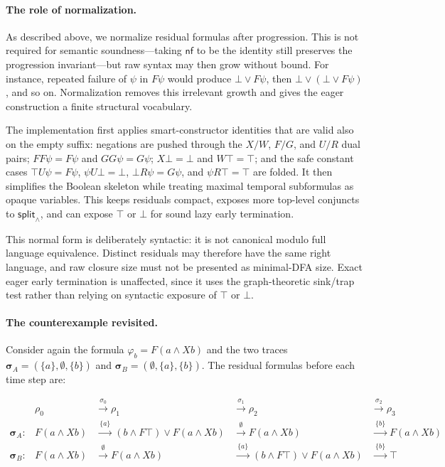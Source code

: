 \paragraph{The role of normalization.}
As described above, we normalize residual formulas after progression.  This is
not required for semantic soundness---taking $\mathsf{nf}$ to be the identity
still preserves the progression invariant---but raw syntax may then grow
without bound.  For instance, repeated failure of $\psi$ in
$F\psi$ would produce $\bot\lor F\psi$, then
$\bot\lor(\bot\lor F\psi)$, and so on.  Normalization removes this irrelevant
growth and gives the eager construction a finite structural vocabulary.

The implementation first applies smart-constructor identities that are valid
also on the empty suffix: negations are pushed through the $X/W$, $F/G$, and
$U/R$ dual pairs; $FF\psi=F\psi$ and $GG\psi=G\psi$;
$X\bot=\bot$ and $W\top=\top$; and the safe constant cases
$\top U\psi=F\psi$, $\psi U\bot=\bot$,
$\bot R\psi=G\psi$, and $\psi R\top=\top$ are folded.  It then simplifies the
Boolean skeleton while treating maximal temporal subformulas as opaque
variables.  This keeps residuals compact, exposes more top-level conjuncts to
$\mathsf{split}_\wedge$, and can expose $\top$ or $\bot$ for sound lazy early
termination.

This normal form is deliberately syntactic: it is not canonical modulo full
\ltlf language equivalence.  Distinct residuals may therefore have the same
right language, and raw closure size must not be presented as minimal-DFA
size.  Exact eager early termination is unaffected, since it uses the
graph-theoretic sink/trap test rather than relying on syntactic exposure of
$\top$ or $\bot$.

\paragraph{The counterexample revisited.}
Consider again the formula $\varphi_b = F(a\land Xb)$ and the two traces $\boldsymbol{\sigma}_A = (\{a\}, \emptyset, \{b\})$ and $\boldsymbol{\sigma}_B = (\emptyset, \{a\}, \{b\})$. The residual formulas before each time step are:

\[
\begin{array}{lllll}
 & \rho_0 & \xrightarrow{\ \sigma_0\ } \rho_1 & \xrightarrow{\ \sigma_1\ } \rho_2 & \xrightarrow{\ \sigma_2\ } \rho_3 \\[0.5ex]
\boldsymbol{\sigma}_A: & F(a \land Xb) & \xrightarrow{\ \{a\}\ } (b\land F\top) \lor F(a \land Xb) & \xrightarrow{\ \emptyset\ } F(a \land Xb) & \xrightarrow{\ \{b\}\ } F(a \land Xb) \\
\boldsymbol{\sigma}_B: & F(a \land Xb) & \xrightarrow{\ \emptyset\ } F(a \land Xb) & \xrightarrow{\ \{a\}\ } (b\land F\top) \lor F(a \land Xb) & \xrightarrow{\ \{b\}\ } \top
\end{array}
\]


